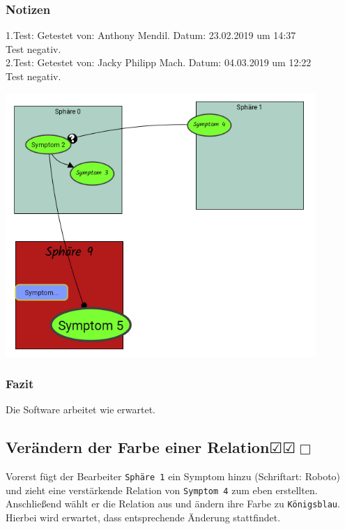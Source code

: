 \documentclass[enabledeprecatedfontcommands]{scrartcl}
\newcommand{\subsectiont}[2]{\subsection[#1]{#1{\normalsize\normalfont #2}}}
\newcommand{\leer}{$\Box$}
\newcommand{\ok}{$\CheckedBox$}
\begin{document}
\subsubsection{Notizen}
1.Test: Getestet von: Anthony Mendil. Datum: 23.02.2019 um 14:37 \\
Test negativ.\\
2.Test: Getestet von: Jacky Philipp Mach. Datum: 04.03.2019 um 12:22 \\
Test negativ.
\begin{center}
\includegraphics[height=10cm]{2_31.PNG}
\end{center}
\subsubsection{Fazit}
Die Software arbeitet wie erwartet.

\subsectiont{Verändern der Farbe einer Relation}{\dotfill\ok\ok\leer}
Vorerst fügt der Bearbeiter \texttt{Sphäre 1} ein Symptom hinzu (Schriftart: Roboto) und zieht eine verstärkende Relation von \texttt{Symptom 4} zum eben erstellten. Anschließend wählt er die Relation aus und ändern ihre Farbe zu \texttt{Königsblau}. Hierbei wird erwartet, dass entsprechende Änderung stattfindet. 
\end{document}

